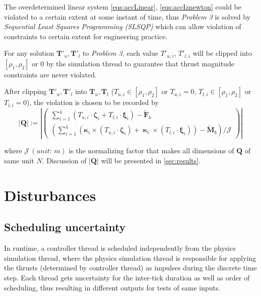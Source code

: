 \documentclass[10pt]{elsarticle}
\begin{document}
The overdetermined linear system \eqref{eqs:accLinear}, \eqref{eqs:accIznewton} could be violated to a certain extent at some instant of time, thus \textit{Problem 3} is solved by \textit{Sequential Least Squares Programming (SLSQP)}\cite{kraft1994algorithm} which can allow violation of constraints to certain extent for engineering practice. 

For any solution $\boldsymbol{T}'_{u}, \boldsymbol{T}'_{l}$ to \textit{Problem 3}, each value $T'_{u,i}$, $T'_{l,i}$ will be clipped into $[\rho_1, \rho_2]$ or $0$ by the simulation thread to guarantee that thrust magnitude constraints are never violated. 

After clipping $\boldsymbol{T}'_{u}, \boldsymbol{T}'_{l}$ into $\boldsymbol{T}_{u}, \boldsymbol{T}_{l}$ ($T_{u,i} \in [\rho_1, \rho_2]$ or $T_{u,i} = 0$, $T_{l,i} \in [\rho_1, \rho_2]$ or $T_{l,i} = 0$), the violation is chosen to be recorded by 
\begin{equation} \label{eqs:ikcv}
|\boldsymbol{Q}| := \left| \begin{pmatrix} \sum\limits_{i=1}^{4}{(T_{u,i} \cdot \boldsymbol{\zeta}_{i} + T_{l,i} \cdot \boldsymbol{\xi}_{i})} - \tilde{\boldsymbol{F}}_b \\ (\sum\limits_{i=1}^{4}{(\boldsymbol{\kappa}_{i} \times (T_{u,i} \cdot \boldsymbol{\zeta}_{i}) + \boldsymbol{\upkappa}_{i} \times (T_{l,i} \cdot \boldsymbol{\xi}_{i}))} - \tilde{\boldsymbol{M}}_b)/\mathcal{J} \end{pmatrix} \right|
\end{equation}

where $\mathcal{J} \, (unit: \, m)$ is the normalizing factor that makes all dimensions of $\boldsymbol{Q}$ of same unit $N$. Discussion of $|\boldsymbol{Q}|$ will be presented in \cref{sec:results}.  

\section{Disturbances} \label{sec:disturbance}
\subsection{Scheduling uncertainty}
In runtime, a controller thread is scheduled independently from the physics simulation thread, where the physics simulation thread is responsible for applying the thrusts (determined by controller thread) as impulses during the discrete time step. Each thread gets uncertainty for the inter-tick duration as well as order of scheduling, thus resulting in different outputs for tests of same inputs.      
\end{document}
